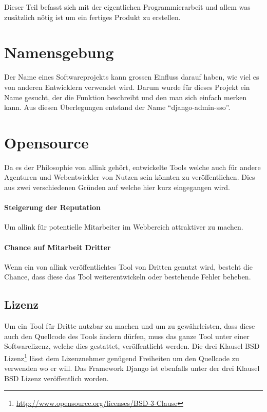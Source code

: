 Dieser Teil befasst sich mit der eigentlichen Programmierarbeit und allem was zusätzlich nötig ist um ein fertiges Produkt zu erstellen.

\section{Namensgebung}
\label{sec:namensgebung}
Der Name eines Softwareprojekts kann grossen Einfluss darauf haben, wie viel es von anderen Entwicklern verwendet wird. Darum wurde für dieses Projekt ein Name gesucht, der die Funktion beschreibt und den man sich einfach merken kann. Aus diesen Überlegungen entstand der Name ``django-admin-sso''.

\section{Opensource}
\label{sec:opensource}
Da es der Philosophie von allink gehört, entwickelte Tools welche auch für andere Agenturen und Webentwickler von Nutzen sein könnten zu veröffentlichen. Dies aus zwei verschiedenen Gründen auf welche hier kurz eingegangen wird.

\paragraph{Steigerung der Reputation}
\label{par:steigerung_der_reputation}
Um allink für potentielle Mitarbeiter im Webbereich attraktiver zu machen.
\paragraph{Chance auf Mitarbeit Dritter}
\label{par:chance_auf_mitarbeit_dritter}
Wenn ein von allink veröffentlichtes Tool von Dritten genutzt wird, besteht die Chance, dass diese das Tool weiterentwickeln oder bestehende Fehler beheben.

\subsection{Lizenz}
\label{sub:lizenz}
Um ein Tool für Dritte nutzbar zu machen und um zu gewährleisten, dass diese auch den Quellcode des Tools ändern dürfen, muss das ganze Tool unter einer Softwarelizenz, welche dies gestattet, veröffentlicht werden. Die drei Klausel BSD Lizenz\footnote{\url{http://www.opensource.org/licenses/BSD-3-Clause}} lässt dem Lizenznehmer genügend Freiheiten um den Quellcode zu verwenden wo er will. Das Framework Django ist ebenfalls unter der drei Klausel BSD Lizenz veröffentlich worden.


